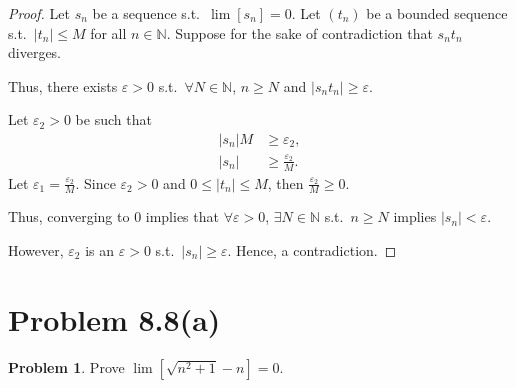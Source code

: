 \documentclass{article}
\theoremstyle{definition}
\newtheorem*{problem}{Problem}
\begin{document}
\begin{proof}
Let $s_n$ be a sequence s.t.\ $\lim[s_n] = 0$. Let $(t_n)$ be a bounded sequence s.t.\ $|t_n| \leq M$ for all $n \in \mathbb{N}$. Suppose for the sake of contradiction that $s_n t_n$ diverges.

Thus, there exists $\varepsilon > 0$ s.t.\ $\forall N \in \mathbb{N}$, $n \geq N$ and $|s_n t_n| \geq \varepsilon$.

Let $\varepsilon_2 > 0$ be such that
\begin{align*}
|s_n| M &\geq \varepsilon_2, \\
|s_n| &\geq \frac{\varepsilon_2}{M}.
\end{align*}
Let $\varepsilon_1 = \frac{\varepsilon_2}{M}$. Since $\varepsilon_2 > 0$ and $0 \leq |t_n| \leq M$, then $\frac{\varepsilon_2}{M} \geq 0$.

Thus, converging to $0$ implies that $\forall \varepsilon > 0$, $\exists N \in \mathbb{N}$ s.t.\ $n \geq N$ implies $|s_n| < \varepsilon$.

However, $\varepsilon_2$ is an $\varepsilon > 0$ s.t.\ $|s_n| \geq \varepsilon$. Hence, a contradiction.
\end{proof}

\clearpage
\section{Problem 8.8(a)}

\begin{problem}
Prove $\lim\left[\sqrt{n^2 + 1} - n\right] = 0$.
\end{problem}
\end{document}
